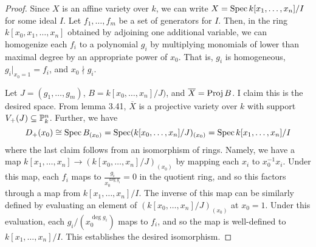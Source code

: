 \begin{proof}
	Since $X$ is an affine variety over $k$, we can write $X = \operatorname{Spec} k[x_1,\ldots,x_n]/I$ for some ideal $I$. Let $f_1,\ldots,f_m$ be a set of generators for $I$. Then, in the ring $k[x_0,x_1,\ldots,x_n]$ obtained by adjoining one additional variable, we can homogenize each $f_i$ to a polynomial $g_i$ by multiplying monomials of lower than maximal degree by an appropriate power of $x_0$. That is, $g_i$ is homogeneous, $g_i|_{x_0=1} = f_i$, and $x_0 \nmid g_i$.
	
	Let $J = (g_1,\ldots,g_m)$, $B = k[x_0,\ldots,x_n]/J)$, and $\overline{X} = \operatorname{Proj} B$. I claim this is the desired space. From lemma 3.41, $\overline{X}$ is a projective variety over $k$ with support $V_{+}(J) \subseteq \mathbb{P}^n_k$. Further, we have
	\[ D_{+}(x_0) \cong \operatorname{Spec} B_{(x_0)} = \operatorname{Spec} (k[x_0,\ldots,x_n]/J)_{(x_0)} = \operatorname{Spec} k[x_1,\ldots,x_n]/I \]
	where the last claim follows from an isomorphism of rings. Namely, we have a map $k[x_1,\ldots,x_n] \to (k[x_0,\ldots,x_n]/J)_{(x_0)}$ by mapping each $x_i$ to $x_0^{-1}x_i$. Under this map, each $f_i$ maps to $\frac{g_i}{x_0^{\deg g_i}} = 0$ in the quotient ring, and so this factors through a map from $k[x_1,\ldots,x_n]/I$. The inverse of this map can be similarly defined by evaluating an element of $(k[x_0,\ldots,x_n]/J)_{(x_0)}$ at $x_0 = 1$. Under this evaluation, each $g_i/(x_0^{\deg g_i})$ maps to $f_i$, and so the map is well-defined to $k[x_1,\ldots,x_n]/I$. This establishes the desired isomorphism.
\end{proof}
